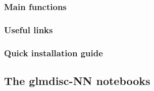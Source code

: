 
\subsubsection{Main functions}


\subsubsection{Useful links}


\subsubsection{Quick installation guide}


\subsection{The glmdisc-NN notebooks}


